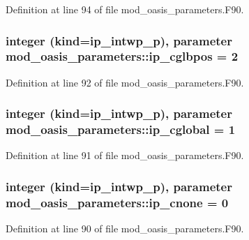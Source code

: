 Definition at line 94 of file mod\+\_\+oasis\+\_\+parameters.\+F90.

\hypertarget{classmod__oasis__parameters_aec700ad0c6a11dd35e5d6c2afb745fd0}{
\subsubsection[{ip\+\_\+cglbpos}]{\setlength{\rightskip}{0pt plus 5cm}integer (kind=ip\+\_\+intwp\+\_\+p), parameter mod\+\_\+oasis\+\_\+parameters\+::ip\+\_\+cglbpos = 2}}\label{classmod__oasis__parameters_aec700ad0c6a11dd35e5d6c2afb745fd0}


Definition at line 92 of file mod\+\_\+oasis\+\_\+parameters.\+F90.

\hypertarget{classmod__oasis__parameters_ae251e3ac1c9c82ae5db2a768d2d59d5f}{
\subsubsection[{ip\+\_\+cglobal}]{\setlength{\rightskip}{0pt plus 5cm}integer (kind=ip\+\_\+intwp\+\_\+p), parameter mod\+\_\+oasis\+\_\+parameters\+::ip\+\_\+cglobal = 1}}\label{classmod__oasis__parameters_ae251e3ac1c9c82ae5db2a768d2d59d5f}


Definition at line 91 of file mod\+\_\+oasis\+\_\+parameters.\+F90.

\hypertarget{classmod__oasis__parameters_ae043e4e2c2b7f04fec7d8c061ef52934}{
\subsubsection[{ip\+\_\+cnone}]{\setlength{\rightskip}{0pt plus 5cm}integer (kind=ip\+\_\+intwp\+\_\+p), parameter mod\+\_\+oasis\+\_\+parameters\+::ip\+\_\+cnone = 0}}\label{classmod__oasis__parameters_ae043e4e2c2b7f04fec7d8c061ef52934}


Definition at line 90 of file mod\+\_\+oasis\+\_\+parameters.\+F90.

